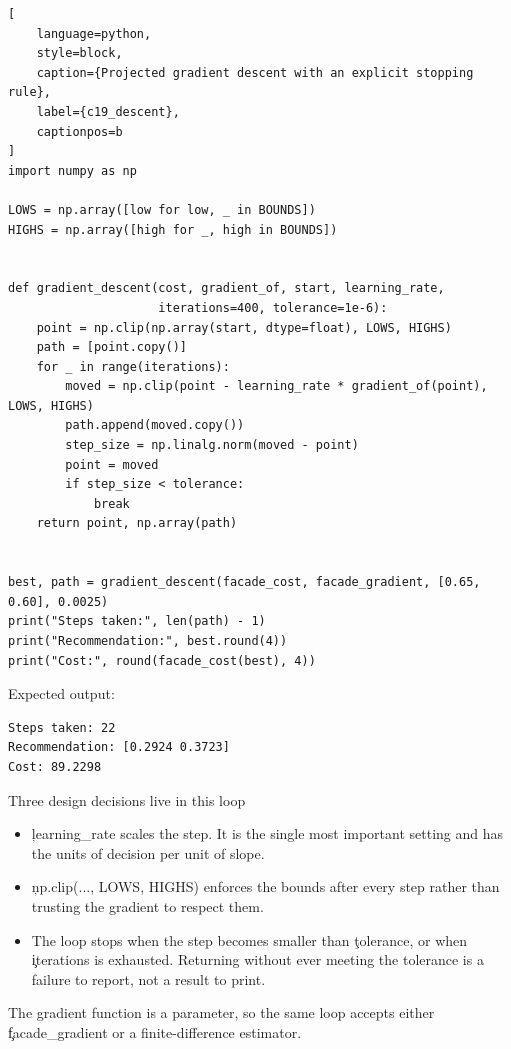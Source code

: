 \begin{lstlisting}[
    language=python,
    style=block,
    caption={Projected gradient descent with an explicit stopping rule},
    label={c19_descent},
    captionpos=b
]
import numpy as np

LOWS = np.array([low for low, _ in BOUNDS])
HIGHS = np.array([high for _, high in BOUNDS])


def gradient_descent(cost, gradient_of, start, learning_rate,
                     iterations=400, tolerance=1e-6):
    point = np.clip(np.array(start, dtype=float), LOWS, HIGHS)
    path = [point.copy()]
    for _ in range(iterations):
        moved = np.clip(point - learning_rate * gradient_of(point), LOWS, HIGHS)
        path.append(moved.copy())
        step_size = np.linalg.norm(moved - point)
        point = moved
        if step_size < tolerance:
            break
    return point, np.array(path)


best, path = gradient_descent(facade_cost, facade_gradient, [0.65, 0.60], 0.0025)
print("Steps taken:", len(path) - 1)
print("Recommendation:", best.round(4))
print("Cost:", round(facade_cost(best), 4))
\end{lstlisting}

Expected output:

\begin{lstlisting}[language=text, style=block, caption={Descent from a poor starting design}, label={c19_descent_output}, captionpos=b]
Steps taken: 22
Recommendation: [0.2924 0.3723]
Cost: 89.2298
\end{lstlisting}

\begin{SyntaxBox}{Three design decisions live in this loop}
\begin{itemize}
    \item \c{learning_rate} scales the step. It is the single most important
          setting and has the units of decision per unit of slope.
    \item \c{np.clip(..., LOWS, HIGHS)} enforces the bounds after every step
          rather than trusting the gradient to respect them.
    \item The loop stops when the step becomes smaller than \c{tolerance}, or
          when \c{iterations} is exhausted. Returning without ever meeting the
          tolerance is a failure to report, not a result to print.
\end{itemize}
The gradient function is a parameter, so the same loop accepts either
\c{facade_gradient} or a finite-difference estimator.
\end{SyntaxBox}

